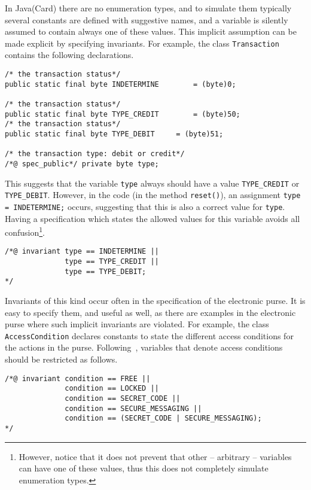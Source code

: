 \documentclass[a4paper]{llncs}
\begin{document}
In Java(Card) there are no enumeration types, and to simulate them
typically several constants are defined with suggestive names, and a
variable is silently assumed to contain always one of these
values. This implicit assumption can be made explicit by specifying
invariants. For example, the class \texttt{Transaction} contains the
following declarations.
\begin{verbatim}
/* the transaction status*/
public static final byte INDETERMINE		= (byte)0;

/* the transaction status*/
public static final byte TYPE_CREDIT		= (byte)50;
/* the transaction status*/
public static final byte TYPE_DEBIT		= (byte)51;
    
/* the transaction type: debit or credit*/
/*@ spec_public*/ private byte type;
\end{verbatim}

This suggests that the variable \texttt{type} always should have a
value \texttt{TYPE\_CREDIT} or \texttt{TYPE\_DEBIT}. However, in the
code (in the method \texttt{reset()}), an assignment \texttt{type =
INDETERMINE;} occurs, suggesting that this is also a correct value for 
\texttt{type}. Having a specification which states the allowed values
for this variable avoids all confusion\footnote{However, notice that it 
does not prevent that other -- arbitrary -- variables can have one of
these values, thus this does not completely simulate enumeration
types.}.
\begin{verbatim}
/*@ invariant type == INDETERMINE ||
              type == TYPE_CREDIT || 
              type == TYPE_DEBIT;
*/
\end{verbatim}

Invariants of this kind occur often in the specification of the
electronic purse. It is easy to specify them, and useful as well, as
there are examples in the electronic purse where such implicit
invariants are violated.
For example, the class \texttt{AccessCondition} declares constants to
state the different access conditions for the actions in the
purse. Following~\cite{?}, variables that denote access conditions
should be restricted as follows.
\begin{verbatim}
/*@ invariant condition == FREE ||
              condition == LOCKED ||
              condition == SECRET_CODE ||
              condition == SECURE_MESSAGING ||
              condition == (SECRET_CODE | SECURE_MESSAGING);
*/
\end{verbatim}
\end{document}
